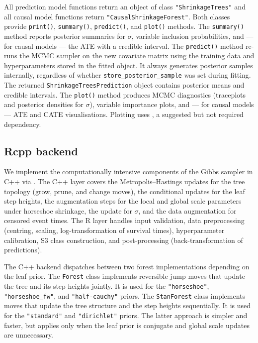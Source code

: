All prediction model functions return an object of class \texttt{"ShrinkageTrees"} and all causal model functions return \texttt{"CausalShrinkageForest"}. Both classes provide \texttt{print()}, \texttt{summary()}, \texttt{predict()}, and \texttt{plot()} methods. The \texttt{summary()} method reports posterior summaries for \(\sigma\), variable inclusion probabilities, and --- for causal models --- the ATE with a credible interval. The \texttt{predict()} method re-runs the MCMC sampler on the new covariate matrix using the training data and hyperparameters stored in the fitted object. It always generates posterior samples internally, regardless of whether \texttt{store\_posterior\_sample} was set during fitting. The returned \texttt{ShrinkageTreesPrediction} object contains posterior means and credible intervals. The \texttt{plot()} method produces MCMC diagnostics (traceplots and posterior densities for \(\sigma\)), variable importance plots, and --- for causal models --- ATE and CATE visualisations. Plotting uses , a suggested but not required dependency.

\subsection{Rcpp backend}\label{rcpp-backend}

We implement the computationally intensive components of the Gibbs sampler in C++ via . The C++ layer covers the Metropolis--Hastings updates for the tree topology (grow, prune, and change moves), the conditional updates for the leaf step heights, the augmentation steps for the local and global scale parameters under horseshoe shrinkage, the update for \(\sigma\), and the data augmentation for censored event times. The R layer handles input validation, data preprocessing (centring, scaling, log-transformation of survival times), hyperparameter calibration, S3 class construction, and post-processing (back-transformation of predictions).

The C++ backend dispatches between two forest implementations depending on the leaf prior. The \texttt{Forest} class implements reversible jump moves that update the tree and its step heights jointly. It is used for the \texttt{"horseshoe"}, \texttt{"horseshoe\_fw"}, and \texttt{"half-cauchy"} priors. The \texttt{StanForest} class implements moves that update the tree structure and the step heights sequentially. It is used for the \texttt{"standard"} and \texttt{"dirichlet"} priors. The latter approach is simpler and faster, but applies only when the leaf prior is conjugate and global scale updates are unnecessary.

